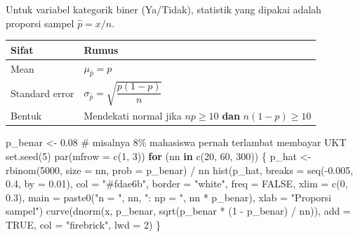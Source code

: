 \documentclass[
  indonesian,
  letterpaper,
]{book}
\newenvironment{Shaded}{\begin{snugshade}}{\end{snugshade}}
\newcommand{\AttributeTok}[1]{\textcolor[rgb]{0.40,0.45,0.13}{#1}}
\newcommand{\CommentTok}[1]{\textcolor[rgb]{0.37,0.37,0.37}{#1}}
\newcommand{\ConstantTok}[1]{\textcolor[rgb]{0.56,0.35,0.01}{#1}}
\newcommand{\ControlFlowTok}[1]{\textcolor[rgb]{0.00,0.23,0.31}{\textbf{#1}}}
\newcommand{\DecValTok}[1]{\textcolor[rgb]{0.68,0.00,0.00}{#1}}
\newcommand{\FloatTok}[1]{\textcolor[rgb]{0.68,0.00,0.00}{#1}}
\newcommand{\FunctionTok}[1]{\textcolor[rgb]{0.28,0.35,0.67}{#1}}
\newcommand{\NormalTok}[1]{\textcolor[rgb]{0.00,0.23,0.31}{#1}}
\newcommand{\OtherTok}[1]{\textcolor[rgb]{0.00,0.23,0.31}{#1}}
\newcommand{\SpecialCharTok}[1]{\textcolor[rgb]{0.37,0.37,0.37}{#1}}
\newcommand{\StringTok}[1]{\textcolor[rgb]{0.13,0.47,0.30}{#1}}
\newcounter{none} %
\begin{document}
Untuk variabel kategorik biner (Ya/Tidak), statistik yang dipakai adalah
proporsi sampel \(\hat{p} = x/n\).

{\def\LTcaptype{none} %
\begin{longtable}[]{@{}ll@{}}
\toprule\noalign{}
Sifat & Rumus \\
\midrule\noalign{}
\endhead
\bottomrule\noalign{}
\endlastfoot
Mean & \(\mu_{\hat{p}} = p\) \\
Standard error & \(\sigma_{\hat{p}} = \sqrt{\dfrac{p(1-p)}{n}}\) \\
Bentuk & Mendekati normal jika \(np \geq 10\) \textbf{dan}
\(n(1-p) \geq 10\) \\
\end{longtable}
}

\begin{Shaded}
\begin{Highlighting}[]
\NormalTok{p\_benar }\OtherTok{\textless{}{-}} \FloatTok{0.08}    \CommentTok{\# misalnya 8\% mahasiswa pernah terlambat membayar UKT}
\FunctionTok{set.seed}\NormalTok{(}\DecValTok{5}\NormalTok{)}
\FunctionTok{par}\NormalTok{(}\AttributeTok{mfrow =} \FunctionTok{c}\NormalTok{(}\DecValTok{1}\NormalTok{, }\DecValTok{3}\NormalTok{))}
\ControlFlowTok{for}\NormalTok{ (nn }\ControlFlowTok{in} \FunctionTok{c}\NormalTok{(}\DecValTok{20}\NormalTok{, }\DecValTok{60}\NormalTok{, }\DecValTok{300}\NormalTok{)) \{}
\NormalTok{  p\_hat }\OtherTok{\textless{}{-}} \FunctionTok{rbinom}\NormalTok{(}\DecValTok{5000}\NormalTok{, }\AttributeTok{size =}\NormalTok{ nn, }\AttributeTok{prob =}\NormalTok{ p\_benar) }\SpecialCharTok{/}\NormalTok{ nn}
  \FunctionTok{hist}\NormalTok{(p\_hat, }\AttributeTok{breaks =} \FunctionTok{seq}\NormalTok{(}\SpecialCharTok{{-}}\FloatTok{0.005}\NormalTok{, }\FloatTok{0.4}\NormalTok{, }\AttributeTok{by =} \FloatTok{0.01}\NormalTok{), }\AttributeTok{col =} \StringTok{"\#fdae6b"}\NormalTok{, }\AttributeTok{border =} \StringTok{"white"}\NormalTok{,}
       \AttributeTok{freq =} \ConstantTok{FALSE}\NormalTok{, }\AttributeTok{xlim =} \FunctionTok{c}\NormalTok{(}\DecValTok{0}\NormalTok{, }\FloatTok{0.3}\NormalTok{),}
       \AttributeTok{main =} \FunctionTok{paste0}\NormalTok{(}\StringTok{"n = "}\NormalTok{, nn, }\StringTok{": np = "}\NormalTok{, nn }\SpecialCharTok{*}\NormalTok{ p\_benar), }\AttributeTok{xlab =} \StringTok{"Proporsi sampel"}\NormalTok{)}
  \FunctionTok{curve}\NormalTok{(}\FunctionTok{dnorm}\NormalTok{(x, p\_benar, }\FunctionTok{sqrt}\NormalTok{(p\_benar }\SpecialCharTok{*}\NormalTok{ (}\DecValTok{1} \SpecialCharTok{{-}}\NormalTok{ p\_benar) }\SpecialCharTok{/}\NormalTok{ nn)), }\AttributeTok{add =} \ConstantTok{TRUE}\NormalTok{,}
        \AttributeTok{col =} \StringTok{"firebrick"}\NormalTok{, }\AttributeTok{lwd =} \DecValTok{2}\NormalTok{)}
\NormalTok{\}}
\end{Highlighting}
\end{Shaded}
\end{document}
